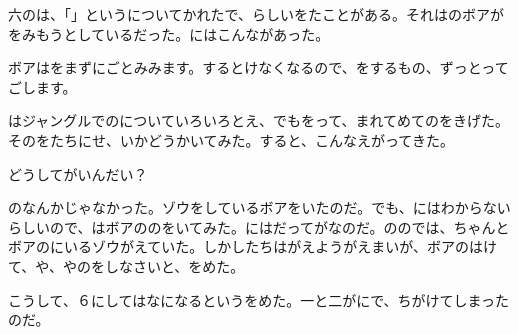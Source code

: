 六のは、「」というについてかれたで、らしいをたことがある。それはのボアがをみもうとしているだった。にはこんながあった。


ボアはをまずにごとみみます。するとけなくなるので、をするもの、ずっとってごします。

はジャングルでのについていろいろとえ、でもをって、まれてめてのをきげた。そのをたちにせ、いかどうかいてみた。すると、こんなえがってきた。

どうしてがいんだい？

のなんかじゃなかった。ゾウをしているボアをいたのだ。でも、にはわからないらしいので、はボアののをいてみた。にはだってがなのだ。ののでは、ちゃんとボアのにいるゾウがえていた。しかしたちはがえようがえまいが、ボアのはけて、や、やのをしなさいと、をめた。

こうして、６にしてはなになるというをめた。一と二がにで、ちがけてしまったのだ。

